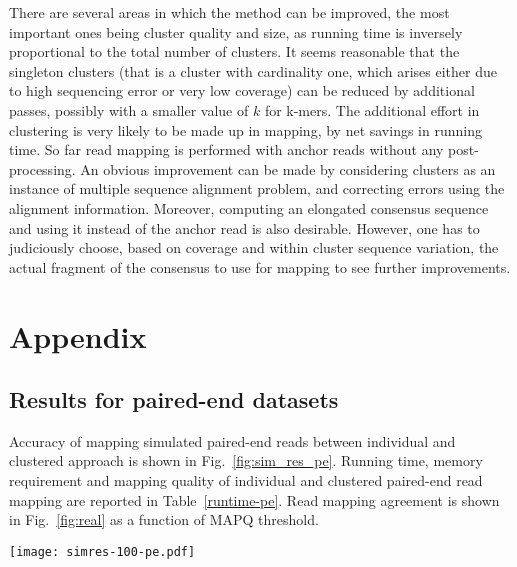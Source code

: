 \documentclass[a4paper]{article}
\begin{document}
There are several areas in which the method can
be improved, the most important ones being cluster quality and
size, as running time is inversely proportional to
the total number of clusters.
It seems reasonable that the
singleton clusters (that is a cluster with cardinality one, which arises either due to high sequencing error or very low coverage)
can be reduced by
additional passes, possibly with a smaller value of $k$ for
k-mers. The additional effort in clustering is very likely to be
made up
in mapping, by net savings in running time.
So far read mapping is performed with anchor reads without any
post-processing.
An obvious improvement can be made by considering
clusters as an instance of multiple sequence alignment problem,
and correcting errors using the alignment information.
Moreover, computing an elongated consensus sequence and using it
instead of the anchor read is also desirable.
However, one has to judiciously choose, based on coverage
and within cluster sequence variation, the actual fragment of the
consensus to use for mapping to see further improvements.







\newpage

\setcounter{figure}{0} 
\renewcommand{\thefigure}{S.\arabic{figure}}
\setcounter{table}{0} 
\renewcommand{\thetable}{S.\arabic{table}}

\section*{Appendix}

\subsection*{Results for paired-end datasets}

Accuracy of mapping simulated paired-end reads between individual and clustered approach is shown in Fig.~\ref{fig:sim_res_pe}. Running time, memory requirement and mapping quality of individual and clustered paired-end read mapping are reported in Table~\ref{runtime-pe}. Read mapping agreement is shown in Fig.~\ref{fig:real} as a function of MAPQ threshold.    

\begin{figure*}
\centering
\texttt{[image: simres-100-pe.pdf]}
\caption{\label{fig:sim_res_pe}
{Quality improvements in detecting SNPs and structural variants.}    }
\end{figure*}
\end{document}
